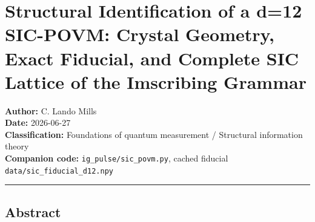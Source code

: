 \hypertarget{structural-identification-of-a-d12-sic-povm-crystal-geometry-exact-fiducial-and-complete-sic-lattice-of-the-imscribing-grammar}{%
\section{Structural Identification of a d=12 SIC-POVM: Crystal Geometry,
Exact Fiducial, and Complete SIC Lattice of the Imscribing
Grammar}\label{structural-identification-of-a-d12-sic-povm-crystal-geometry-exact-fiducial-and-complete-sic-lattice-of-the-imscribing-grammar}}

\textbf{Author:} C. Lando Mills\\
\textbf{Date:} 2026-06-27\\
\textbf{Classification:} Foundations of quantum measurement / Structural
information theory\\
\textbf{Companion code:} \texttt{ig\_pulse/sic\_povm.py}, cached
fiducial \texttt{data/sic\_fiducial\_d12.npy}

\begin{center}\rule{0.5\linewidth}{0.5pt}\end{center}

\hypertarget{abstract}{%
\subsection{Abstract}\label{abstract}}

